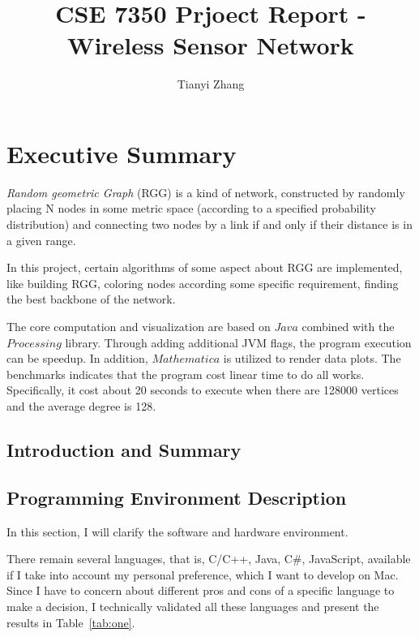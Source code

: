 \documentclass[prodmode,acmtecs]{acmsmall} %
\begin{document}
\title{CSE 7350 Prjoect Report - Wireless Sensor Network}
\author{Tianyi Zhang
    }

\maketitle

\section{Executive Summary}
\emph{Random geometric Graph} (RGG) is a kind of network, constructed by randomly placing N nodes in some metric space (according to a specified probability distribution) and connecting two nodes by a link if and only if their distance is in a given range\cite{wiki:rgg}. 

In this project, certain algorithms of some aspect about RGG are implemented, like building RGG, coloring nodes according some specific requirement, finding the best backbone of the network.

The core computation and visualization are based on $Java$ combined with the $Processing$ library. Through adding additional JVM flags, the program execution can be speedup. In addition, $Mathematica$ is utilized to render data plots.
The benchmarks indicates that the program cost linear time to do all works. Specifically, it cost about 20 seconds to execute when there are 128000 vertices and the average degree is 128.

\subsection{Introduction and Summary}

\subsection{Programming Environment Description}

In this section, I will clarify the software and hardware environment.

There remain several languages, that is, C/C++, Java, C\#, JavaScript, available if I take into account my personal preference, which I want to develop on Mac. Since I have to concern about different pros and cons of a specific language to make a decision, I technically validated all these languages and present the results in Table~\ref{tab:one}.
\end{document}

